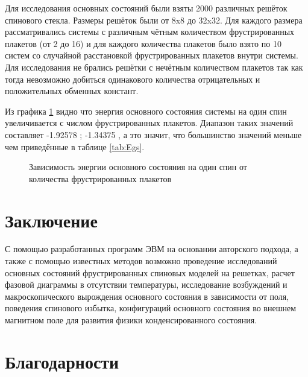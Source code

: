 \documentclass[utf8, babel, sor, jor, amsmath, amssymb, reprint]{elsarticle} %
\begin{document}
Для исследования основных состояний были взяты 2000 различных решёток спинового стекла.
Размеры решёток были от 8x8 до 32x32. Для каждого размера рассматривались системы с различным чётным количеством фрустрированных плакетов (от 2 до 16) и для каждого количества плакетов было взято по 10 систем со случайной расстановкой фрустрированных плакетов внутри системы. Для исследования не  брались решётки с нечётным количеством плакетов так как тогда невозможно добиться одинакового количества отрицательных и положительных обменных констант. 

Из графика \ref{fig:Egs_N_F} видно что энергия основного состояния системы на один спин увеличивается с числом фрустрированных плакетов. Диапазон таких значений составляет -1.92578 ; -1.34375 , а это значит, что большинство значений меньше чем приведённые в таблице \ref{tab:Egs}. 

\begin{figure}[h]
	\centering
	\caption{Зависимость энергии основного состояния на один спин от количества фрустрированных плакетов}
	\label{fig:Egs_N_F}
\end{figure}



\section{Заключение}

С помощью разработанных программ ЭВМ на основании авторского подхода, а также с помощью известных методов возможно проведение исследований основных состояний фрустрированных спиновых моделей на решетках, расчет фазовой диаграммы в отсутствии температуры, исследование возбуждений и макроскопического вырождения основного состояния в зависимости от поля, поведения спинового избытка, конфигураций основного состояния во внешнем магнитном поле для развития физики конденсированного состояния.


\section{Благодарности}

 


\end{document}
